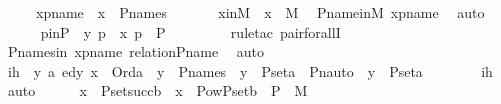 \begin{isabellebody}
\ \ \ \ \ xpname\ {\isacharcolon}{\kern0pt}\ {\isachardoublequoteopen}x\ {\isasymin}\ P{\isacharunderscore}{\kern0pt}names{\isachardoublequoteclose}\ \isanewline
\isanewline
\ \ \ \ \isamarkupfalse%
\ xinM\ {\isacharcolon}{\kern0pt}\ {\isachardoublequoteopen}x\ {\isasymin}\ M{\isachardoublequoteclose}\ \isamarkupfalse%
\ P{\isacharunderscore}{\kern0pt}name{\isacharunderscore}{\kern0pt}in{\isacharunderscore}{\kern0pt}M\ xpname\ \isamarkupfalse%
\ auto\ \isanewline
\isanewline
\ \ \ \ \isamarkupfalse%
\ pinP\ {\isacharcolon}{\kern0pt}\ {\isachardoublequoteopen}{\isasymforall}{\isacharless}{\kern0pt}y{\isacharcomma}{\kern0pt}\ p{\isachargreater}{\kern0pt}\ {\isasymin}\ x{\isachardot}{\kern0pt}\ p\ {\isasymin}\ P{\isachardoublequoteclose}\ \isanewline
\ \ \ \ \ \ \isamarkupfalse%
\ {\isacharparenleft}{\kern0pt}rule{\isacharunderscore}{\kern0pt}tac\ pair{\isacharunderscore}{\kern0pt}forallI{\isacharparenright}{\kern0pt}\ \isanewline
\ \ \ \ \ \ \isamarkupfalse%
\ P{\isacharunderscore}{\kern0pt}names{\isacharunderscore}{\kern0pt}in\ xpname\ relation{\isacharunderscore}{\kern0pt}P{\isacharunderscore}{\kern0pt}name\ \isamarkupfalse%
\ auto\ \isanewline
\isanewline
\ \ \ \ \isamarkupfalse%
\ ih\ {\isacharcolon}{\kern0pt}\ {\isachardoublequoteopen}{\isasymAnd}y\ a{\isachardot}{\kern0pt}\ ed{\isacharparenleft}{\kern0pt}y{\isacharcomma}{\kern0pt}\ x{\isacharparenright}{\kern0pt}\ {\isasymLongrightarrow}\ Ord{\isacharparenleft}{\kern0pt}a{\isacharparenright}{\kern0pt}\ {\isasymLongrightarrow}\ y\ {\isasymin}\ P{\isacharunderscore}{\kern0pt}names\ {\isasymLongrightarrow}\ {\isacharparenleft}{\kern0pt}y\ {\isasymin}\ P{\isacharunderscore}{\kern0pt}set{\isacharparenleft}{\kern0pt}a{\isacharparenright}{\kern0pt}\ {\isasymlongleftrightarrow}\ Pn{\isacharunderscore}{\kern0pt}auto{\isacharparenleft}{\kern0pt}{\isasympi}{\isacharparenright}{\kern0pt}\ {\isacharbackquote}{\kern0pt}\ y\ {\isasymin}\ P{\isacharunderscore}{\kern0pt}set{\isacharparenleft}{\kern0pt}a{\isacharparenright}{\kern0pt}{\isacharparenright}{\kern0pt}{\isachardoublequoteclose}\isanewline
\ \ \ \ \ \ \isamarkupfalse%
\ ih\ \isamarkupfalse%
\ auto\isanewline
\isanewline
\ \ \ \ \isamarkupfalse%
\ {\isachardoublequoteopen}x\ {\isasymin}\ P{\isacharunderscore}{\kern0pt}set{\isacharparenleft}{\kern0pt}succ{\isacharparenleft}{\kern0pt}b{\isacharparenright}{\kern0pt}{\isacharparenright}{\kern0pt}\ {\isasymlongleftrightarrow}\ x\ {\isasymin}\ Pow{\isacharparenleft}{\kern0pt}P{\isacharunderscore}{\kern0pt}set{\isacharparenleft}{\kern0pt}b{\isacharparenright}{\kern0pt}\ {\isasymtimes}\ P{\isacharparenright}{\kern0pt}\ {\isasyminter}\ M{\isachardoublequoteclose}\ \isamarkupfalse%

\end{isabellebody}
